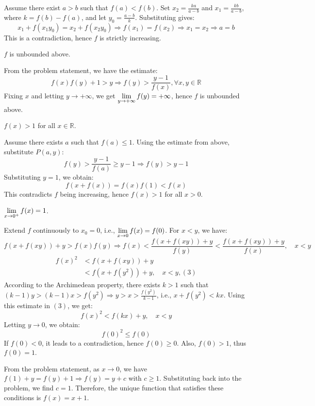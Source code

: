 \documentclass[11pt]{scrartcl}
\begin{document}
\begin{itemize}[label=, leftmargin=0em, itemsep=0.2em]
\begin{sol}
\begin{pro}
    Assume there exist $a > b$ such that $f(a) < f(b)$. Set $x_2 = \frac{ka}{a-b}$ and $x_1 = \frac{kb}{a-b}$, where $k = f(b) - f(a)$, and let $y_0 = \frac{a-b}{k}$. Substituting gives:
    \[
        x_1 + f(x_1 y_0) = x_2 + f(x_2 y_0) \Rightarrow f(x_1) = f(x_2) \Rightarrow x_1 = x_2 \Rightarrow a = b
    \]
    This is a contradiction, hence $f$ is strictly increasing.
\end{pro}

 $f$ is unbounded above.
\begin{pro}
    From the problem statement, we have the estimate:
    \[
        f(x)f(y) + 1 > y \Rightarrow f(y) > \frac{y - 1}{f(x)}, \forall x, y \in \mathbb{R}
    \]
    Fixing $x$ and letting $y \to +\infty$, we get $\displaystyle\lim_{y \to +\infty} f(y) = +\infty$, hence $f$ is unbounded above.
\end{pro}

 $f(x) > 1$ for all $x \in \mathbb{R}$.
\begin{pro}
    Assume there exists $a$ such that $f(a) \leq 1$. Using the estimate from above, substitute $P(a,y)$:
    \[
        f(y) > \frac{y - 1}{f(a)} \geq y - 1 \Rightarrow f(y) > y - 1
    \]
    Substituting $y = 1$, we obtain:
    \[
        f(x + f(x)) = f(x)f(1) < f(x)
    \]
    This contradicts $f$ being increasing, hence $f(x) > 1$ for all $x > 0$.
\end{pro}

 $\displaystyle\lim_{x \to 0^+} f(x) = 1$.
\begin{pro}
    Extend $f$ continuously to $x_0 = 0$, i.e., $\displaystyle\lim_{x \to 0} f(x) = f(0)$. For $x < y$, we have:
    \[
        f(x + f(xy)) + y > f(x)f(y) \Rightarrow f(x) < \frac{f(x + f(xy)) + y}{f(y)} < \frac{f(x + f(xy)) + y}{f(x)}, \quad x < y
    \]
    \[
        \begin{aligned}
            f(x)^2 &< f(x + f(xy)) + y \\
            &< f(x + f(y^2)) + y, \quad x < y,(3)
        \end{aligned}
    \]
    According to the Archimedean property, there exists $k > 1$ such that $(k - 1)y > (k - 1)x > f(y^2) \Rightarrow y > x > \frac{f(y^2)}{k - 1}$, i.e., $x + f(y^2) < kx$. Using this estimate in $(3)$, we get:
    \[
        f(x)^2 < f(kx) + y, \quad x < y
    \]
    Letting $y \to 0$, we obtain:
    \[
        f(0)^2 \leq f(0)
    \]
    If $f(0) < 0$, it leads to a contradiction, hence $f(0) \geq 0$. Also, $f(0) > 1$, thus $f(0) = 1$.
    \end{pro}
        From the problem statement, as $x \to 0$, we have $f(1) + y = f(y) + 1 \Rightarrow f(y) = y + c$ with $c \geq 1$. Substituting back into the problem, we find $c = 1$. Therefore, the unique function that satisfies these conditions is $\boxed{f(x) = x + 1}$.
    \end{sol}


\end{itemize}
\end{document}
